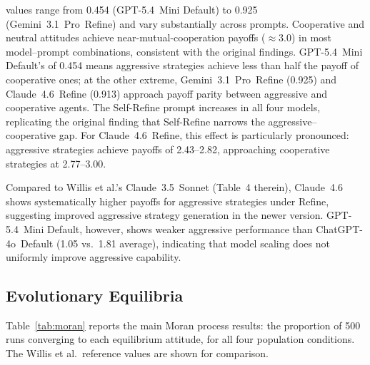 \ICD values range from 0.454 (GPT-5.4~Mini Default) to 0.925 (Gemini~3.1~Pro~Refine)
and vary substantially across prompts. Cooperative and neutral attitudes achieve
near-mutual-cooperation payoffs ($\approx 3.0$) in most model--prompt combinations,
consistent with the original findings. GPT-5.4~Mini Default's \ICD of 0.454
means aggressive strategies achieve less than half the payoff of cooperative ones;
at the other extreme, Gemini~3.1~Pro~Refine (0.925) and Claude~4.6~Refine (0.913)
approach payoff parity between aggressive and cooperative agents. The Self-Refine
prompt increases \ICD in all four models, replicating the original finding that
Self-Refine narrows the aggressive--cooperative gap. For Claude~4.6~Refine,
this effect is particularly pronounced: aggressive strategies achieve payoffs
of 2.43--2.82, approaching cooperative strategies at 2.77--3.00.

Compared to Willis et al.'s Claude~3.5~Sonnet (Table~4 therein), Claude~4.6
shows systematically higher payoffs for aggressive strategies under Refine,
suggesting improved aggressive strategy generation in the newer version.
GPT-5.4~Mini Default, however, shows weaker aggressive performance than
ChatGPT-4o~Default (1.05 vs.\ 1.81 average), indicating that model scaling
does not uniformly improve aggressive capability.

\subsection{Evolutionary Equilibria}

Table~\ref{tab:moran} reports the main Moran process results: the proportion
of 500 runs converging to each equilibrium attitude, for all four population
conditions. The Willis et al.\ reference values are shown for comparison.

